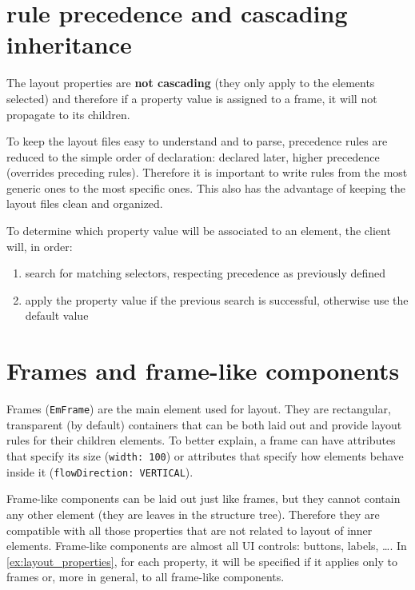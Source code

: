 \section{rule precedence and cascading inheritance}
\label{ex:rule_precedence}

The layout properties are \textbf{not cascading} (they only apply to the elements selected) and therefore if a property value is assigned to a frame, it will not propagate to its children.

To keep the layout files easy to understand and to parse, precedence rules are reduced to the simple order of declaration: declared later, higher precedence (overrides preceding rules). Therefore it is important to write rules from the most generic ones to the most specific ones. This also has the advantage of keeping the layout files clean and organized.

To determine which property value will be associated to an element, the client will, in order:

\begin{enumerate}
    \item search for matching selectors, respecting precedence as previously defined
    \item apply the property value if the previous search is successful, otherwise use the default value
\end{enumerate}

\section{Frames and frame-like components}

Frames (\texttt{EmFrame}) are the main element used for layout. They are rectangular, transparent (by default) containers that can be both laid out and provide layout rules for their children elements. To better explain, a frame can have attributes that specify its size (\texttt{width: 100}) or attributes that specify how elements behave inside it (\texttt{flowDirection: VERTICAL}).

Frame-like components can be laid out just like frames, but they cannot contain any other element (they are leaves in the structure tree). Therefore they are compatible with all those properties that are not related to layout of inner elements. Frame-like components are almost all UI controls: buttons, labels, \ldots . In \ref{ex:layout_properties}, for each property, it will be specified if it applies only to frames or, more in general, to all frame-like components.

